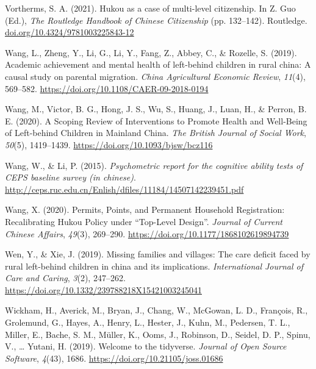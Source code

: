 \documentclass[
  man,floatsintext]{apa7}
\newlength{\cslhangindent}
\newlength{\cslentryspacingunit} %
\newenvironment{CSLReferences}[2] %
 {%
  \setlength{\parindent}{0pt}
  \ifodd #1
  \let\oldpar\par
  \def\par{\hangindent=\cslhangindent\oldpar}
  \fi
  \setlength{\parskip}{#2\cslentryspacingunit}
 }%
 {}
\begin{document}
\begin{CSLReferences}{1}{0}
\leavevmode{}%
Vortherms, S. A. (2021). Hukou as a case of multi-level citizenship. In Z. Guo (Ed.), \emph{The Routledge Handbook of Chinese Citizenship} (pp. 132--142). Routledge. \href{https://doi.org/10.4324/9781003225843-12}{doi.org/10.4324/9781003225843-12}

\leavevmode{}%
Wang, L., Zheng, Y., Li, G., Li, Y., Fang, Z., Abbey, C., \& Rozelle, S. (2019). Academic achievement and mental health of left-behind children in rural china: A causal study on parental migration. \emph{China Agricultural Economic Review}, \emph{11}(4), 569--582. \url{https://doi.org/10.1108/CAER-09-2018-0194}

\leavevmode{}%
Wang, M., Victor, B. G., Hong, J. S., Wu, S., Huang, J., Luan, H., \& Perron, B. E. (2020). A Scoping Review of Interventions to Promote Health and Well-Being of Left-behind Children in Mainland China. \emph{The British Journal of Social Work}, \emph{50}(5), 1419--1439. \url{https://doi.org/10.1093/bjsw/bcz116}

\leavevmode{}%
Wang, W., \& Li, P. (2015). \emph{Psychometric report for the cognitive ability tests of CEPS baseline survey (in chinese)}. \url{http://ceps.ruc.edu.cn/Enlish/dfiles/11184/14507142239451.pdf}

\leavevmode{}%
Wang, X. (2020). Permits, Points, and Permanent Household Registration: Recalibrating Hukou Policy under {``}Top-Level Design{''}. \emph{Journal of Current Chinese Affairs}, \emph{49}(3), 269--290. \url{https://doi.org/10.1177/1868102619894739}

\leavevmode{}%
Wen, Y., \& Xie, J. (2019). Missing families and villages: The care deficit faced by rural left-behind children in china and its implications. \emph{International Journal of Care and Caring}, \emph{3}(2), 247--262. \url{https://doi.org/10.1332/239788218X15421003245041}

\leavevmode{}%
Wickham, H., Averick, M., Bryan, J., Chang, W., McGowan, L. D., François, R., Grolemund, G., Hayes, A., Henry, L., Hester, J., Kuhn, M., Pedersen, T. L., Miller, E., Bache, S. M., Müller, K., Ooms, J., Robinson, D., Seidel, D. P., Spinu, V., \ldots{} Yutani, H. (2019). Welcome to the {tidyverse}. \emph{Journal of Open Source Software}, \emph{4}(43), 1686. \url{https://doi.org/10.21105/joss.01686}


\end{CSLReferences}
\end{document}
